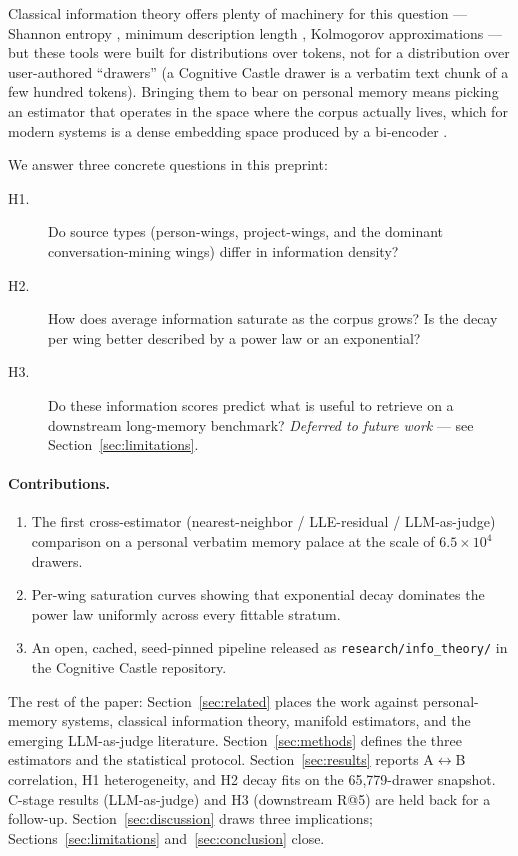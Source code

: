 \documentclass[11pt]{article}
\begin{document}
Classical information theory offers plenty of machinery for this question
--- Shannon entropy \citep{shannon1948}, minimum description length
\citep{rissanen1978}, Kolmogorov approximations \citep{cover2006} --- but
these tools were built for distributions over tokens, not for a
distribution over user-authored ``drawers'' (a Cognitive Castle drawer is
a verbatim text chunk of a few hundred tokens). Bringing them to bear on
personal memory means picking an estimator that operates in the space
where the corpus actually lives, which for modern systems is a dense
embedding space produced by a bi-encoder \citep{bgem3}.

We answer three concrete questions in this preprint:
\begin{description}
  \item[H1.] Do source types (person-wings, project-wings, and the
    dominant conversation-mining wings) differ in information density?
  \item[H2.] How does average information saturate as the corpus grows?
    Is the decay per wing better described by a power law or an
    exponential?
  \item[H3.] Do these information scores predict what is useful to
    retrieve on a downstream long-memory benchmark? \emph{Deferred to
    future work} --- see Section~\ref{sec:limitations}.
\end{description}

\paragraph{Contributions.}
\begin{enumerate}
  \item The first cross-estimator (nearest-neighbor / LLE-residual /
    LLM-as-judge) comparison on a personal verbatim memory palace at the
    scale of $6.5 \times 10^4$ drawers.
  \item Per-wing saturation curves showing that exponential decay
    dominates the power law uniformly across every fittable stratum.
  \item An open, cached, seed-pinned pipeline released as
    \texttt{research/info\_theory/} in the Cognitive Castle repository.
\end{enumerate}

The rest of the paper: Section~\ref{sec:related} places the work
against personal-memory systems, classical information theory, manifold
estimators, and the emerging LLM-as-judge literature. Section~\ref{sec:methods}
defines the three estimators and the statistical protocol.
Section~\ref{sec:results} reports A$\leftrightarrow$B correlation, H1
heterogeneity, and H2 decay fits on the 65,779-drawer snapshot. C-stage
results (LLM-as-judge) and H3 (downstream R@5) are held back for a
follow-up. Section~\ref{sec:discussion} draws three implications;
Sections~\ref{sec:limitations} and~\ref{sec:conclusion} close.
\end{document}
